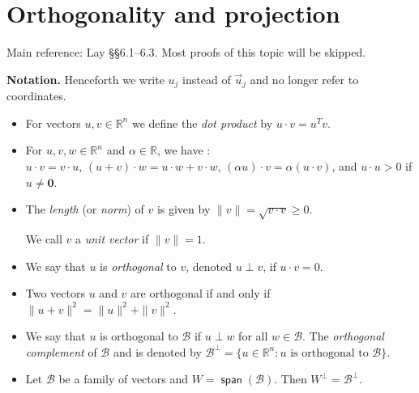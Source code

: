 \documentclass[11pt]{article}
\newcommand{\1}{\mathbf{1}}
\newcommand{\0}{\mathbf{0}}
\newcommand{\B}{\mathcal{B}}
\newcommand{\F}{\mathbb{F}}
\newcommand{\R}{\mathbb{R}}
\DeclareMathOperator{\myspan}{\mathsf{span}}
\DeclareMathOperator{\mydot}{\boldsymbol{\cdot}}
\newcommand{\vu}{\vec{u}}
\renewcommand{\geq}{\geqslant}
\begin{document}
\clearpage
\section{Orthogonality and projection}

Main reference:
Lay
\S\S6.1--6.3.
Most proofs of this topic will be skipped.

\textbf{Notation.}
Henceforth we write $u_j$ instead of $\vu_j$ and no longer refer to coordinates.

\begin{itemize}

\item



For vectors $u,v \in \R^n$ we define the \emph{dot product} by $u \mydot v = u^T v$.

\item

For $u,v,w \in \R^n$ and $\alpha \in \R$, we have :
\\
$u \mydot v = v \mydot u$, 
$(u+v) \mydot w = u \mydot w + v \mydot w$, $(\alpha u) \mydot v = \alpha (u \mydot v)$, and $u \mydot u > 0$ if $u \ne \0$.

\item

The \emph{length} (or \emph{norm}) of $v$ is given by $\|v\|=\sqrt{v \mydot v} \geq 0$.

We call $v$ a \emph{unit vector} if $\|v\|=1$.

\item

We say that $u$ is \emph{orthogonal} to $v$, denoted $u \perp v$, if $u \mydot v = 0$.

\item

Two vectors $u$ and $v$ are orthogonal if and only if $\|u+v\|^2 = \|u\|^2 + \|v\|^2$.

\item

We say that $u$ is orthogonal to $\B$ if $u \perp w$ for all $w \in \B$.
The \emph{orthogonal complement} of $\B$ and is denoted by $\B^\perp = \{ u \in \R^n : u \text{ is orthogonal to } \B\}$.

\item

Let $\B$ be a family of vectors and $W = \myspan(\B)$.
Then $W^\perp = \B^\perp$.


\end{itemize}
\end{document}
